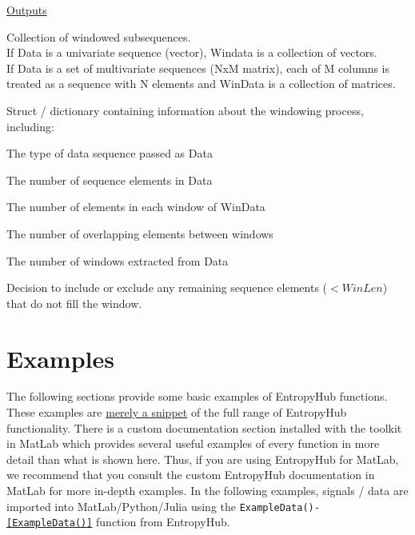 \documentclass[12pt, a4paper, titlepage, openany]{book}
\newcommand\chapterimage[2][]{%
  \AddToShipoutPictureBG*{%
    \AtTextUpperLeft{%
     \hspace*{\textwidth}%
      \llap{%
            \texttt{[image: \#2]}}}}}%
\begin{document}
\noindent \ul{Outputs}
\begin{description}[labelsep=1cm, labelwidth=4cm, nosep,style=multiline,leftmargin=3cm]\footnotesize
\item[\texttt{WinData}]	Collection of windowed subsequences.\\ If Data is a univariate sequence (vector), Windata is a collection of vectors. \\
If Data is a set of multivariate sequences (NxM matrix), each of M columns is treated as a sequence with N elements and WinData is a collection of matrices.  
\item[\texttt{Log}]	Struct / dictionary containing information about the windowing process, including:\\
\begin{description}[labelsep=1cm, labelwidth=4cm, nosep,style=multiline,leftmargin=3cm]\footnotesize
\item[\texttt{DataType}]	 The type of data sequence passed as Data
\item[\texttt{DataLength}]   The number of sequence elements in Data
\item[\texttt{WindowLength}]   The number of elements in each window of WinData
\item[\texttt{WindowOverlap}]   The number of overlapping elements between windows
\item[\texttt{TotalWindows}]  The number of windows extracted from Data
\item[\texttt{Mode}]   Decision to include or exclude any remaining sequence elements ($< WinLen$) that do not fill the window.
\end{description}
\end{description}





\newpage
\chapter{\textbf{Examples}}
\chapterimage[width=16cm, height=3cm]{Chapter Banner2.png}
\vspace{45mm}


The following sections provide some basic examples of EntropyHub functions. These examples are \ul{merely a snippet} of the full range of EntropyHub functionality.\newline \newline
\noindent  There is a custom documentation section installed with the toolkit in MatLab which provides several useful examples of every function in more detail than what is shown here.  Thus, if you are using EntropyHub for MatLab, we recommend that you consult the custom EntropyHub documentation in MatLab for more in-depth examples.
\newline \newline
In the following examples, signals / data are imported into MatLab/Python/Julia using the \texttt{ExampleData()- \ref{ExampleData()}} function from EntropyHub.
\end{document}
